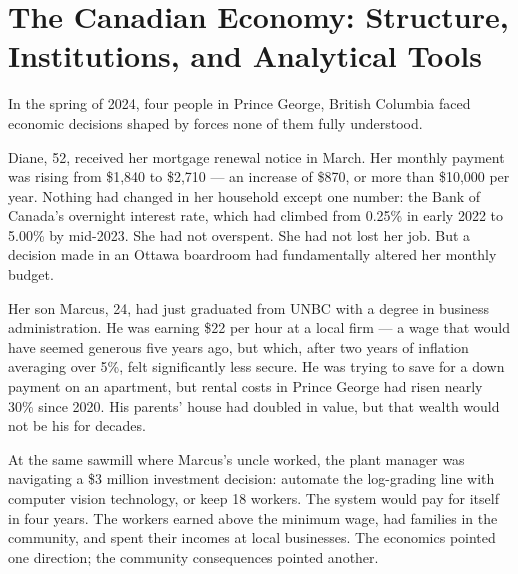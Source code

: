
\chapter{The Canadian Economy: Structure, Institutions, and Analytical Tools}
\label{ch:introduction}


\noindent In the spring of 2024, four people in Prince George, British Columbia
faced economic decisions shaped by forces none of them fully understood.

Diane, 52, received her mortgage renewal notice in March. Her monthly payment
was rising from \$1,840 to \$2,710 --- an increase of \$870, or more than
\$10,000 per year. Nothing had changed in her household except one number:
the Bank of Canada's overnight interest rate, which had climbed from 0.25\%
in early 2022 to 5.00\% by mid-2023. She had not overspent. She had not lost
her job. But a decision made in an Ottawa boardroom had fundamentally altered
her monthly budget.

Her son Marcus, 24, had just graduated from UNBC with a degree in business
administration. He was earning \$22 per hour at a local firm --- a wage that
would have seemed generous five years ago, but which, after two years of
inflation averaging over 5\%, felt significantly less secure. He was
trying to save for a down payment on an apartment, but rental costs in Prince
George had risen nearly 30\% since 2020. His parents' house had doubled in
value, but that wealth would not be his for decades.

At the same sawmill where Marcus's uncle worked, the plant manager was
navigating a \$3 million investment decision: automate the log-grading line
with computer vision technology, or keep 18 workers. The system would pay for
itself in four years. The workers earned above the minimum wage, had families
in the community, and spent their incomes at local businesses. The economics
pointed one direction; the community consequences pointed another.

